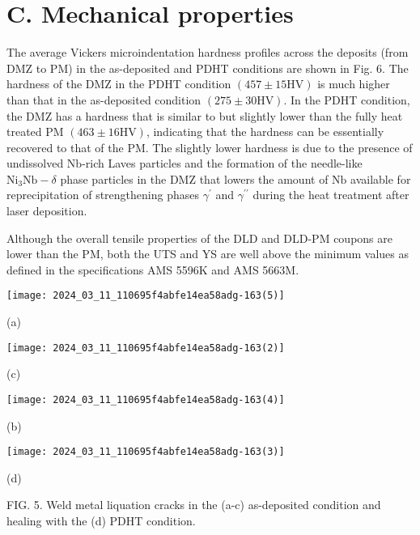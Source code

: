 \documentclass[10pt]{article}
\begin{document}
\section*{C. Mechanical properties}
The average Vickers microindentation hardness profiles across the deposits (from DMZ to PM) in the as-deposited and PDHT conditions are shown in Fig. 6. The hardness of the DMZ in the PDHT condition $(457 \pm 15 \mathrm{HV})$ is much higher than that in the as-deposited condition $(275 \pm 30 \mathrm{HV})$. In the PDHT condition, the DMZ has a hardness that is similar to but slightly lower than the fully heat treated PM $(463 \pm 16 \mathrm{HV})$, indicating that the hardness can be essentially recovered to that of the PM. The slightly lower hardness is due to the presence of undissolved $\mathrm{Nb}$-rich Laves particles and the formation of the needle-like $\mathrm{Ni}_{3} \mathrm{Nb}-\delta$ phase particles in the DMZ that lowers the amount of $\mathrm{Nb}$ available for reprecipitation of strengthening phases $\gamma^{\prime}$ and $\gamma^{\prime \prime}$ during the heat treatment after laser deposition.

Although the overall tensile properties of the DLD and DLD-PM coupons are lower than the PM, both the UTS and YS are well above the minimum values as defined in the specifications AMS 5596K and AMS 5663M.

\begin{center}
\texttt{[image: 2024\_03\_11\_110695f4abfe14ea58adg-163(5)]}
\end{center}

(a)

\begin{center}
\texttt{[image: 2024\_03\_11\_110695f4abfe14ea58adg-163(2)]}
\end{center}

(c)

\begin{center}
\texttt{[image: 2024\_03\_11\_110695f4abfe14ea58adg-163(4)]}
\end{center}

(b)

\begin{center}
\texttt{[image: 2024\_03\_11\_110695f4abfe14ea58adg-163(3)]}
\end{center}

(d)

FIG. 5. Weld metal liquation cracks in the (a-c) as-deposited condition and healing with the (d) PDHT condition.
\end{document}
